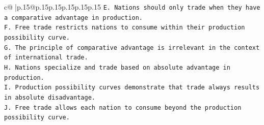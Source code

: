 \documentclass{article}
\begin{document}
{\begin{supertabular}{c@{$\;$}|p{.15\linewidth}@{}p{.15\linewidth}p{.15\linewidth}p{.15\linewidth}p{.15\linewidth}p{.15\linewidth}}
{{{\texttt{E. Nations should only trade when they have a comparative advantage in production.} \\
\texttt{F. Free trade restricts nations to consume within their production possibility curve.} \\
\texttt{G. The principle of comparative advantage is irrelevant in the context of international trade.} \\
\texttt{H. Nations specialize and trade based on absolute advantage in production.} \\
\texttt{I. Production possibility curves demonstrate that trade always results in absolute disadvantage.} \\
\texttt{J. Free trade allows each nation to consume beyond the production possibility curve.} \\
            }
        }
    }
     \\ \\


\end{supertabular}}
\end{document}

